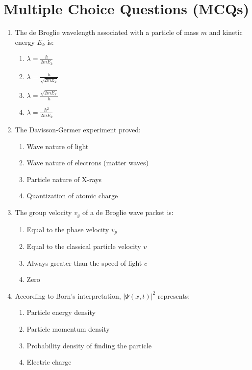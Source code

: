 \section{Multiple Choice Questions (MCQs)}

\begin{enumerate}
    \item The de Broglie wavelength associated with a particle of mass $m$ and kinetic energy $E_k$ is:
    \begin{enumerate}
        \item $\lambda = \frac{h}{2m E_k}$
        \item $\lambda = \frac{h}{\sqrt{2m E_k}}$
        \item $\lambda = \frac{\sqrt{2m E_k}}{h}$
        \item $\lambda = \frac{h^2}{2m E_k}$
    \end{enumerate}
    
    \item The Davisson-Germer experiment proved:
    \begin{enumerate}
        \item Wave nature of light
        \item Wave nature of electrons (matter waves)
        \item Particle nature of X-rays
        \item Quantization of atomic charge
    \end{enumerate}
    
    \item The group velocity $v_g$ of a de Broglie wave packet is:
    \begin{enumerate}
        \item Equal to the phase velocity $v_p$
        \item Equal to the classical particle velocity $v$
        \item Always greater than the speed of light $c$
        \item Zero
    \end{enumerate}
    
    \item According to Born's interpretation, $|\Psi(x,t)|^2$ represents:
    \begin{enumerate}
        \item Particle energy density
        \item Particle momentum density
        \item Probability density of finding the particle
        \item Electric charge
    \end{enumerate}
    

\end{enumerate}
